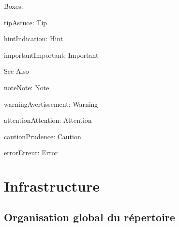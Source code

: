 \documentclass[letterpaper,10pt,french]{sphinxmanual}
\begin{document}
\sphinxAtStartPar
Boxes:

\begin{sphinxadmonition}{tip}{Astuce:}
\sphinxAtStartPar
Tip
\end{sphinxadmonition}

\begin{sphinxadmonition}{hint}{Indication:}
\sphinxAtStartPar
Hint
\end{sphinxadmonition}

\begin{sphinxadmonition}{important}{Important:}
\sphinxAtStartPar
Important
\end{sphinxadmonition}


\nopagebreak


\sphinxAtStartPar
See Also



\begin{sphinxadmonition}{note}{Note:}
\sphinxAtStartPar
Note
\end{sphinxadmonition}

\begin{sphinxadmonition}{warning}{Avertissement:}
\sphinxAtStartPar
Warning
\end{sphinxadmonition}

\begin{sphinxadmonition}{attention}{Attention:}
\sphinxAtStartPar
Attention
\end{sphinxadmonition}

\begin{sphinxadmonition}{caution}{Prudence:}
\sphinxAtStartPar
Caution
\end{sphinxadmonition}

\begin{sphinxadmonition}{error}{Erreur:}
\sphinxAtStartPar
Error
\end{sphinxadmonition}


\section{Infrastructure}
\label{\detokenize{infrastructure:infrastructure}}\label{\detokenize{infrastructure::doc}}

\subsection{Organisation global du répertoire}
\label{\detokenize{infrastructure:organisation-global-du-repertoire}}
\end{document}
